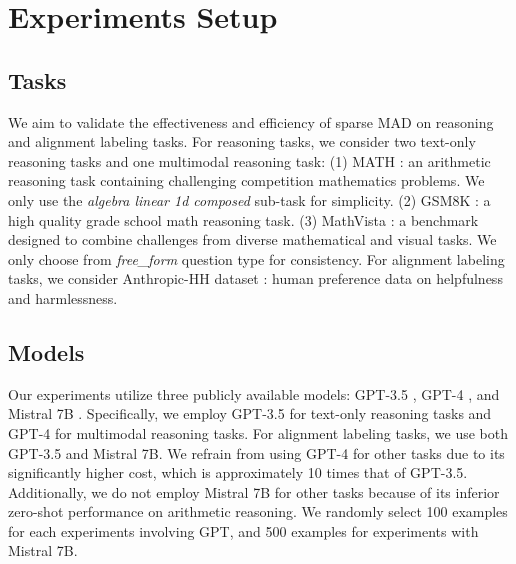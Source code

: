 \documentclass[11pt]{article}
\begin{document}
\section{Experiments Setup}
\subsection{Tasks}
We aim to validate the effectiveness and efficiency of sparse MAD on reasoning and alignment labeling tasks. For reasoning tasks, we consider two text-only reasoning tasks and one multimodal reasoning task: (1) MATH \cite{hendrycks2021measuring}: an arithmetic reasoning task containing challenging competition mathematics problems. We only use the \textit{algebra linear 1d composed} sub-task for simplicity. (2) GSM8K \cite{cobbe2021training}: a high quality grade school math reasoning task. (3) MathVista \cite{lu2023mathvista}: a benchmark designed to combine challenges from diverse mathematical and visual tasks. We only choose from \textit{free\_form} question type for consistency. For alignment labeling tasks, we consider Anthropic-HH dataset \cite{bai2022training}: human preference data on helpfulness and harmlessness.

\subsection{Models}
Our experiments utilize three publicly available models: GPT-3.5 \cite{gpt35}, GPT-4 \cite{gpt4}, and Mistral 7B \cite{jiang2023mistral}. Specifically, we employ GPT-3.5 for text-only reasoning tasks and GPT-4 for multimodal reasoning tasks. For alignment labeling tasks, we use both GPT-3.5 and Mistral 7B. We refrain from using GPT-4 for other tasks due to its significantly higher cost, which is approximately 10 times that of GPT-3.5. Additionally, we do not employ Mistral 7B for other tasks because of its inferior zero-shot performance on arithmetic reasoning. We randomly select 100 examples for each experiments involving GPT, and 500 examples for experiments with Mistral 7B.
\end{document}
